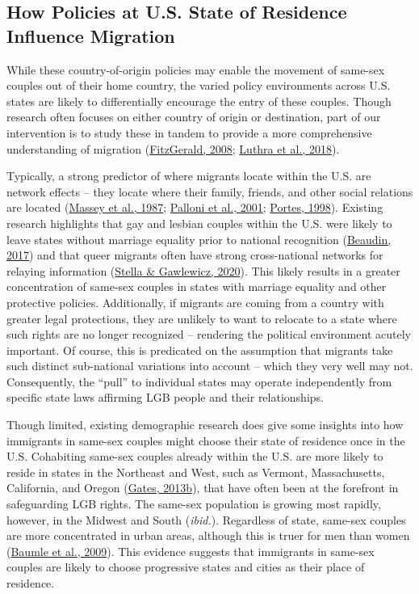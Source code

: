 \documentclass[
  11pt,
]{article}
\begin{document}
\hypertarget{how-policies-at-u.s.-state-of-residence-influence-migration}{%
\subsection{How Policies at U.S. State of Residence Influence Migration}\label{how-policies-at-u.s.-state-of-residence-influence-migration}}

While these country-of-origin policies may enable the movement of same-sex couples out of their home country, the varied policy environments across U.S. states are likely to differentially encourage the entry of these couples. Though research often focuses on either country of origin or destination, part of our intervention is to study these in tandem to provide a more comprehensive understanding of migration (\protect\hyperlink{ref-fitzgerald_2008}{FitzGerald, 2008}; \protect\hyperlink{ref-luthra_2018}{Luthra et al., 2018}).

Typically, a strong predictor of where migrants locate within the U.S. are network effects -- they locate where their family, friends, and other social relations are located (\protect\hyperlink{ref-massey_1987}{Massey et al., 1987}; \protect\hyperlink{ref-palloni_2001}{Palloni et al., 2001}; \protect\hyperlink{ref-portes_1998}{Portes, 1998}). Existing research highlights that gay and lesbian couples within the U.S. were likely to leave states without marriage equality prior to national recognition (\protect\hyperlink{ref-beaudin_2017}{Beaudin, 2017}) and that queer migrants often have strong cross-national networks for relaying information (\protect\hyperlink{ref-stella_2020}{Stella \& Gawlewicz, 2020}). This likely results in a greater concentration of same-sex couples in states with marriage equality and other protective policies. Additionally, if migrants are coming from a country with greater legal protections, they are unlikely to want to relocate to a state where such rights are no longer recognized -- rendering the political environment acutely important. Of course, this is predicated on the assumption that migrants take such distinct sub-national variations into account -- which they very well may not. Consequently, the ``pull'' to individual states may operate independently from specific state laws affirming LGB people and their relationships.

Though limited, existing demographic research does give some insights into how immigrants in same-sex couples might choose their state of residence once in the U.S. Cohabiting same-sex couples already within the U.S. are more likely to reside in states in the Northeast and West, such as Vermont, Massachusetts, California, and Oregon (\protect\hyperlink{ref-gates_2013a}{Gates, 2013b}), that have often been at the forefront in safeguarding LGB rights. The same-sex population is growing most rapidly, however, in the Midwest and South (\emph{ibid.}). Regardless of state, same-sex couples are more concentrated in urban areas, although this is truer for men than women (\protect\hyperlink{ref-baumle_2009}{Baumle et al., 2009}). This evidence suggests that immigrants in same-sex couples are likely to choose progressive states and cities as their place of residence.
\end{document}
